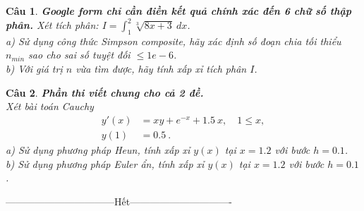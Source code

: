 \documentclass[11pt]{article}
\newtheorem{bt}{Câu}
\begin{document}
\begin{bt} \textbf{Google form chỉ cần điền kết quả chính xác đến 6 chữ số thập phân.} Xét tích phân: $I = \int_{1}^{2} \sqrt[3]{8x+3} \ dx$. \\
a) Sử dụng công thức Simpson composite, hãy xác định số đoạn chia tối thiểu $n_{min}$ sao cho sai số tuyệt đối $\leq 1e-6$. \\
b) Với giá trị $n$ vừa tìm được, hãy tính xấp xỉ tích phân $I$.
\end{bt}

\begin{bt} \textbf{Phần thi viết chung cho cả 2 đề.} \\ 
Xét bài toán Cauchy  
\begin{align}
	y'(x) &= xy + e^{-x} + 1.5 \ x, \quad 1 \leq x, \\
	y(1)  &= 0.5 \ . 
\end{align}
%
a) Sử dụng phương pháp Heun, tính xấp xỉ $y(x)$ tại $x=1.2$ với bước $h = 0.1$. \\
b) Sử dụng phương pháp Euler ẩn, tính xấp xỉ $y(x)$ tại $x=1.2$ với bước $h = 0.1$. \\
\end{bt}

\centerline{———————————Hết——————————-}
\end{document}
